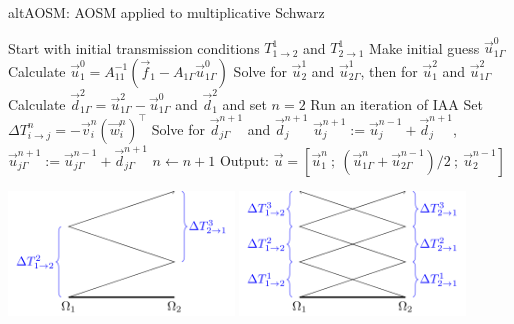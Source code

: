 \documentclass{beamer}
\begin{document}
\begin{frame}
\begin{algorithm}[H]
	\caption{altAOSM: AOSM applied to multiplicative Schwarz} %
	\label{alg: alt}
	\begin{algorithmic}[1]
		\State Start with initial transmission conditions $T_{1 \to 2}^1$ and $T_{2 \to 1}^1$
		\State Make initial guess $\vec{u}_{1 \Gamma}^0$
		\State Calculate $\vec{u}_1^0 = A_{11}^{-1} ( \vec{f}_1 - A_{1 \Gamma} \vec{u}_{1 \Gamma}^0 )$
		\State Solve for $\vec{u}_2^1$ and $\vec{u}_{2 \Gamma}^1$, then for $\vec{u}_1^2$ and $\vec{u}_{1 \Gamma}^2$
		\State Calculate $\vec{d}_{1 \Gamma}^2 = \vec{u}_{1 \Gamma}^2 - \vec{u}_{1 \Gamma}^0$ and $\vec{d}_1^2$ and set $n=2$
				\State Run an iteration of IAA
				\State Set $\Delta T_{i \to j}^n = - \vec{v}_i^n (\vec{w}_i^n)^\top$
				\State Solve for $\vec{d}_{j \Gamma}^{n+1}$ and $\vec{d}_j^{n+1}$
				\State $\vec{u}_j^{n+1} := \vec{u}_j^{n-1} + \vec{d}_j^{n+1}$, $\vec{u}_{j \Gamma}^{n+1} := \vec{u}_{j \Gamma}^{n-1} + \vec{d}_{j \Gamma}^{n+1}$
				\State $n \gets n+1$
			\EndFor
		\EndWhile
		\State Output: $\vec{u} = [ \vec{u}_1^n \ ; \ (\vec{u}_{1 \Gamma}^n + \vec{u}_{2 \Gamma}^{n-1})/2 \ ; \ \vec{u}_2^{n-1} ]$
	\end{algorithmic}
\end{algorithm}
\end{frame}

\begin{frame}
\centering
\includegraphics[width=0.45\textwidth]{AOSM/TIKZ_AOSM_20230614_3.png}
\includegraphics[width=0.45\textwidth]{AOSM/TIKZ_AOSM_20230614_4.png}
\end{frame}
\end{document}
